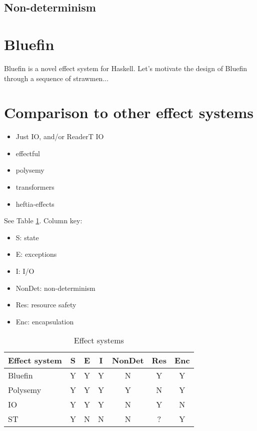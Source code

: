 \documentclass[sigplan,screen]{acmart}
\begin{document}
\subsection{Non-determinism}

\section{Bluefin}

Bluefin is a novel effect system for Haskell.  Let's motivate the
design of Bluefin through a sequence of strawmen...

\section{Comparison to other effect systems}

\begin{itemize}
\item Just IO, and/or ReaderT IO
\item effectful
\item polysemy
\item transformers
\item heftia-effects
\end{itemize}

See Table \ref{tab:comparison}.  Column key:

\begin{itemize}
\item S: state
\item E: exceptions
\item I: I/O
\item NonDet: non-determinism
\item Res: resource safety
\item Enc: encapsulation
\end{itemize}

\begin{table}
  \caption{Effect systems}
  \label{tab:comparison}
  \begin{tabular}{lcccccc}
    \toprule
    Effect system & S & E & I & NonDet & Res & Enc \\
    \midrule
    Bluefin & Y & Y & Y & N & Y & Y\\
    Polysemy & Y & Y & Y & Y & N & Y\\
    IO & Y & Y & Y & N & Y & N\\
    ST & Y & N & N & N & ? & Y\\
  \bottomrule
\end{tabular}
\end{table}
\end{document}
